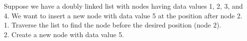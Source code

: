 \documentclass[preview]{standalone}
\begin{document}
Suppose we have a doubly linked list with nodes having data values 1, 2, 3, and 4. We want to insert a new node with data value 5 at the position after node 2.\\1. Traverse the list to find the node before the desired position (node 2).\\2. Create a new node with data value 5.\\
\end{document}
